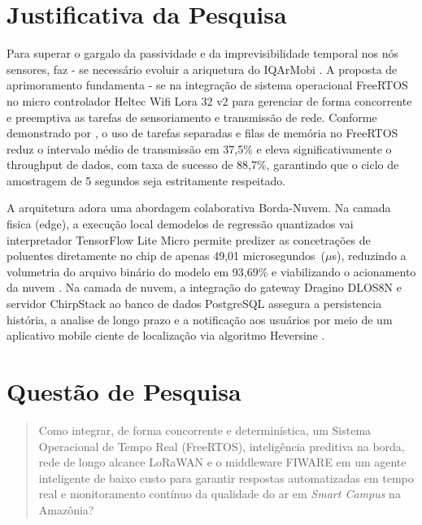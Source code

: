 \section{Justificativa da Pesquisa}

Para superar o gargalo da passividade e da imprevisibilidade temporal nos nós sensores,
faz - se necessário evoluir a ariquetura do IQArMobi \cite{cunha2024,wcama}. A proposta de aprimoramento
fundamenta - se na integração de sistema operacional FreeRTOS no micro controlador Heltec Wifi Lora 32 v2
para gerenciar de forma concorrente e preemptiva as tarefas de sensoriamento e transmissão
de rede. Conforme demonstrado por , o uso de tarefas separadas e filas de memória
no FreeRTOS reduz o intervalo médio de transmissão em 37,5\% e eleva significativamente o throughput de dados, com taxa de sucesso de 
88,7\%, garantindo que o ciclo de amostragem de 5 segundos seja estritamente respeitado.

A arquitetura adora uma abordagem colaborativa Borda-Nuvem. Na camada fisica (edge), a execução local demodelos de 
regressão quantizados vai interpretador TensorFlow Lite Micro permite predizer as concetrações
de poluentes diretamente no chip de apenas 49,01 microsegundos~($\mu$s), reduzindo a volumetria do arquivo
binário do modelo em 93,69\% e viabilizando o acionamento da nuvem \cite{rodrigues2024tinyml}. Na camada de nuvem,
a integração do gateway Dragino DLOS8N e servidor ChirpStack ao banco de dados PostgreSQL assegura a persistencia
história, a analise de longo prazo e a notificação aos usuários por meio de um
aplicativo mobile ciente de localização via algoritmo Heversine \cite{cunha2024,wcama}.

\section{Questão de Pesquisa}

\begin{quote}
Como integrar, de forma concorrente e determinística, 
um Sistema Operacional de Tempo Real (FreeRTOS), 
inteligência preditiva na borda, rede de longo alcance LoRaWAN 
e o middleware FIWARE em um agente inteligente de baixo custo 
para garantir respostas automatizadas em tempo real e monitoramento 
contínuo da qualidade do ar em \emph{Smart Campus} na Amazônia?
 \cite{alves2025freertos}

\end{quote}